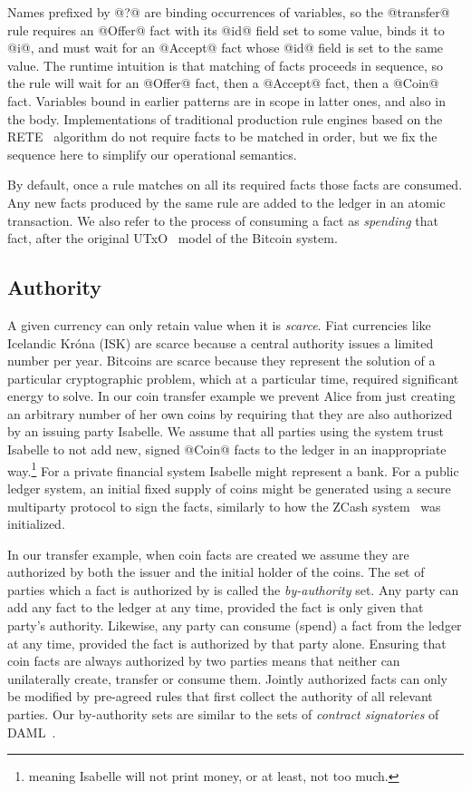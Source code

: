 Names prefixed by @?@ are binding occurrences of variables, so the @transfer@ rule requires an @Offer@ fact with its @id@ field set to some value, binds it to @i@, and must wait for an @Accept@ fact whose @id@ field is set to the same value. The runtime intuition is that matching of facts proceeds in sequence, so the rule will wait for an @Offer@ fact, then a @Accept@ fact, then a @Coin@ fact. Variables bound in earlier patterns are in scope in latter ones, and also in the body. Implementations of traditional production rule engines based on the RETE~\cite{Forgy1981:RETE} algorithm do not require facts to be matched in order, but we fix the sequence here to simplify our operational semantics.

By default, once a rule matches on all its required facts those facts are consumed. Any new facts produced by the same rule are added to the ledger in an atomic transaction. We also refer to the process of consuming a fact as \emph{spending} that fact, after the original UTxO~\cite{Zahnentferner2018:UTxO} model of the Bitcoin system.


\subsection{Authority}
\label{s:FactAuthority}
A given currency can only retain value when it is \emph{scarce}. Fiat currencies like Icelandic Kr\'ona (ISK) are scarce because a central authority issues a limited number per year. Bitcoins are scarce because they represent the solution of a particular cryptographic problem, which at a particular time, required significant energy to solve. In our coin transfer example we prevent Alice from just creating an arbitrary number of her own coins by requiring that they are also authorized by an issuing party Isabelle. We assume that all parties using the system trust Isabelle to not add new, signed @Coin@ facts to the ledger in an inappropriate way.\footnote{meaning Isabelle will not print money, or at least, not too much.} For a private financial system Isabelle might represent a bank. For a public ledger system, an initial fixed supply of coins might be generated using a secure multiparty protocol to sign the facts, similarly to how the ZCash system~\cite{Bowe2018:MultiParty, Hopwood2016:zcash} was initialized.

\eject{}
In our transfer example, when coin facts are created we assume they are authorized by both the issuer and the initial holder of the coins. The set of parties which a fact is authorized by is called the \emph{by-authority} set. Any party can add any fact to the ledger at any time, provided the fact is only given that party's authority. Likewise, any party can consume (spend) a fact from the ledger at any time, provided the fact is authorized by that party alone. Ensuring that coin facts are always authorized by two parties means that neither can unilaterally create, transfer or consume them. Jointly authorized facts can only be modified by pre-agreed rules that first collect the authority of all relevant parties. Our by-authority sets are similar to the sets of \emph{contract signatories} of DAML~\cite{DA2019:DAML}.

